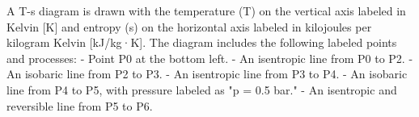 A T-s diagram is drawn with the temperature (T) on the vertical axis labeled in Kelvin [K] and entropy (s) on the horizontal axis labeled in kilojoules per kilogram Kelvin [kJ/kg·K].  
The diagram includes the following labeled points and processes:  
- Point P0 at the bottom left.  
- An isentropic line from P0 to P2.  
- An isobaric line from P2 to P3.  
- An isentropic line from P3 to P4.  
- An isobaric line from P4 to P5, with pressure labeled as "p = 0.5 bar."  
- An isentropic and reversible line from P5 to P6.